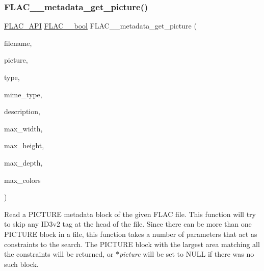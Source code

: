 \subsubsection{\texorpdfstring{F\+L\+A\+C\+\_\+\+\_\+metadata\+\_\+get\+\_\+picture()}{FLAC\_\_metadata\_get\_picture()}}
{\footnotesize\ttfamily \hyperlink{group__flac__export_ga56ca07df8a23310707732b1c0007d6f5}{F\+L\+A\+C\+\_\+\+A\+PI} \hyperlink{ordinals_8h_a95103469f1cbd78b8cf250194985b34e}{F\+L\+A\+C\+\_\+\+\_\+bool} F\+L\+A\+C\+\_\+\+\_\+metadata\+\_\+get\+\_\+picture (\begin{DoxyParamCaption}\item[{\hyperlink{zconf_8h_a2c212835823e3c54a8ab6d95c652660e}{const} char $\ast$}]{filename,  }\item[{\hyperlink{struct_f_l_a_c_____stream_metadata}{F\+L\+A\+C\+\_\+\+\_\+\+Stream\+Metadata} $\ast$$\ast$}]{picture,  }\item[{\hyperlink{group__flac__format_gaf6d3e836cee023e0b8d897f1fdc9825d}{F\+L\+A\+C\+\_\+\+\_\+\+Stream\+Metadata\+\_\+\+Picture\+\_\+\+Type}}]{type,  }\item[{\hyperlink{zconf_8h_a2c212835823e3c54a8ab6d95c652660e}{const} char $\ast$}]{mime\+\_\+type,  }\item[{\hyperlink{zconf_8h_a2c212835823e3c54a8ab6d95c652660e}{const} \hyperlink{ordinals_8h_a5eb569b12d5b047cdacada4d57924ee3}{F\+L\+A\+C\+\_\+\+\_\+byte} $\ast$}]{description,  }\item[{unsigned}]{max\+\_\+width,  }\item[{unsigned}]{max\+\_\+height,  }\item[{unsigned}]{max\+\_\+depth,  }\item[{unsigned}]{max\+\_\+colors }\end{DoxyParamCaption})}

Read a P\+I\+C\+T\+U\+RE metadata block of the given F\+L\+AC file. This function will try to skip any I\+D3v2 tag at the head of the file. Since there can be more than one P\+I\+C\+T\+U\+RE block in a file, this function takes a number of parameters that act as constraints to the search. The P\+I\+C\+T\+U\+RE block with the largest area matching all the constraints will be returned, or {\itshape $\ast$picture} will be set to {\ttfamily N\+U\+LL} if there was no such block.


